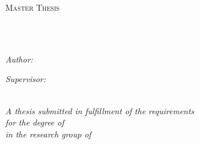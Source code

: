 \documentclass[
10pt, %
twoside, %
chapterinoneline,%
onehalfspacing, %
nolistspacing, %
parskip, %
headsepline, %
english,
]{MastersDoctoralThesis} %
\author{Philipp Hacker} %
\date{\today} %
\begin{document}
\frontmatter %

\pagestyle{plain} %


\begin{titlepage}
	
	\begin{center}
		
		{\scshape\LARGE \univname\par}\vspace{1.5cm} %
		\textsc{\Large Master Thesis}\\[0.5cm] %
		
		\HRule\\[0.4cm]%
		{\huge \bfseries \ttitle\par}\vspace{0.4cm} %
		\HRule\\[1.5cm]%
		
		\begin{minipage}[htbp]{0.4\textwidth}
			
			\begin{flushleft} \large
				\emph{Author:}\\
				\authorname%
			\end{flushleft}
			
		\end{minipage}
		\hfill
		\begin{minipage}[htbp]{0.4\textwidth}
			
			\begin{flushright}\large
				
				\emph{Supervisor:} \\
				\supname%

			\end{flushright}
			
		\end{minipage}\\[1.5cm]
		
		\large \textit{A thesis submitted in fulfillment of the requirements\\ for the degree of \degreename}\\[0.3cm] %
		\textit{in the research group of}\\[0.4cm]
		\groupname\\\deptname\\[1cm] %
		

\end{center}
\end{titlepage}
\end{document}
